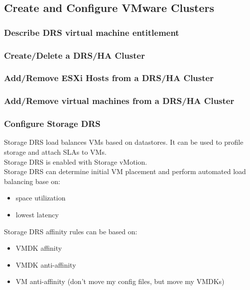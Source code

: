 \subsection{Create and Configure VMware Clusters}

\subsubsection{Describe DRS virtual machine entitlement}

\subsubsection{Create/Delete a DRS/HA Cluster}

\subsubsection{Add/Remove ESXi Hosts from a DRS/HA Cluster}

\subsubsection{Add/Remove virtual machines from a DRS/HA Cluster}

\subsubsection{Configure Storage DRS}

Storage DRS load balances VMs based on datastores. It can be used to profile
storage and attach SLAs to VMs.\\

Storage DRS is enabled with Storage vMotion.\\

Storage DRS can determine initial VM placement and perform automated load
balancing base on:

\begin{itemize}

\item space utilization
\item lowest latency

\end{itemize}

Storage DRS affinity rules can be based on:

\begin{itemize}

\item VMDK affinity
\item VMDK anti-affinity
\item VM anti-affinity (don't move my config files, but move my VMDKs)

\end{itemize}

